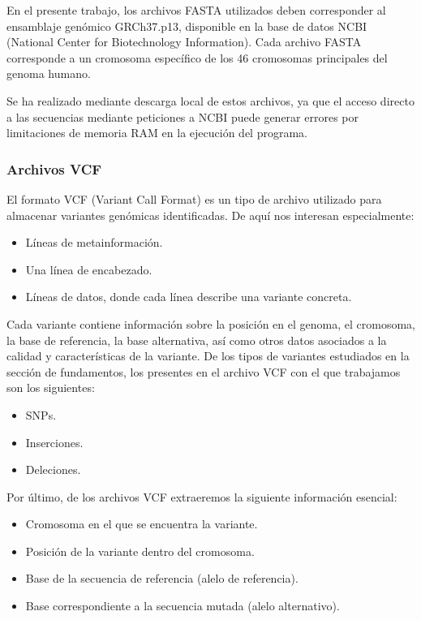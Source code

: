 \documentclass[11pt,spanish,listoffigures,listoftables]{tfgetsinf}
\begin{document}
En el presente trabajo, los archivos \acs{FASTA} utilizados deben corresponder al ensamblaje genómico GRCh37.p13, disponible en la base de datos \acs{NCBI} (National Center for Biotechnology Information). Cada archivo \acs{FASTA} corresponde a un cromosoma específico de los 46 cromosomas principales del genoma humano. 

Se ha realizado mediante descarga local de estos archivos, ya que el acceso directo a las secuencias mediante peticiones a \acs{NCBI} puede generar errores por limitaciones de memoria RAM en la ejecución del programa. 

\subsubsection{Archivos VCF}

El formato \acs{VCF} (Variant Call Format) es un tipo de archivo utilizado para almacenar variantes genómicas identificadas. De aquí nos interesan especialmente: 

\begin{itemize}
   \item Líneas de metainformación. 
   \item Una línea de encabezado.
   \item Líneas de datos, donde cada línea describe una variante concreta. 
\end{itemize}

Cada variante contiene información sobre la posición en el genoma, el cromosoma, la base de referencia, la base alternativa, así como otros datos asociados a la calidad y características de la variante. De los tipos de variantes estudiados en la sección de fundamentos, los presentes en el archivo \acs{VCF} con el que trabajamos son los siguientes: 

\begin{itemize}
   \item \acs{SNP}s. 
   \item Inserciones. 
   \item Deleciones.
\end{itemize}

Por último, de los archivos \acs{VCF} extraeremos la siguiente información esencial: 

\begin{itemize}
   \item Cromosoma en el que se encuentra la variante.
   \item Posición de la variante dentro del cromosoma.  
   \item Base de la secuencia de referencia (alelo de referencia).
   \item Base correspondiente a la secuencia mutada (alelo alternativo).
\end{itemize}
 
\end{document}
